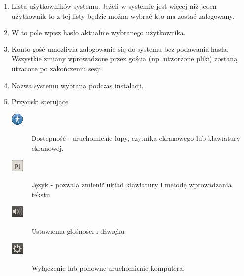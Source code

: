 \begin{enumerate}
\item Lista użytkowników systemu. Jeżeli w systemie jest więcej niż jeden użytkownik to z tej listy będzie można wybrać kto ma zostać zalogowany.
\item W to pole wpisz hasło aktualnie wybranego użytkownika.
\item Konto gość umozliwia zalogowanie się do systemu bez podawania hasła. Wszystkie zmiany wprowadzone przez gościa (np. utworzone pliki) zostaną utracone po zakończeniu sesji.
\item Nazwa systemu wybrana podczas instalacji.
\item Przyciski sterujące
\begin{description}
\item[\includegraphics{images/ikony_dostempnosc.png}]Dostepność - uruchomienie lupy, czytnika ekranowego lub klawiatury ekranowej.
\item[\includegraphics{images/ikony_jezyk.png}]Język - pozwala zmienić układ klawiatury i metodę wprowadzania tekstu.
\item[\includegraphics{images/ikony_dzwiek.png}]Ustawienia głośności i dźwięku
\item[\includegraphics{images/ikony_zasilanie.png}]Wyłączenie lub ponowne uruchomienie komputera.
\end{description}
\end{enumerate}
\clearpage